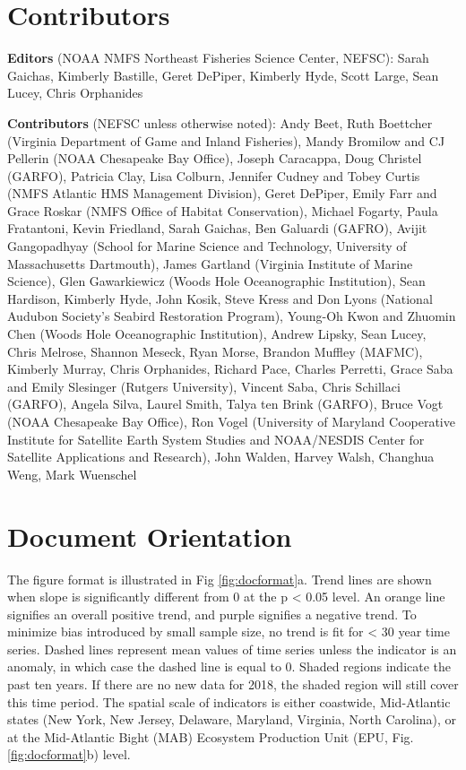 \documentclass[
  10pt,
]{article}
\begin{document}
\hypertarget{contributors}{%
\section{Contributors}\label{contributors}}

\textbf{Editors} (NOAA NMFS Northeast Fisheries Science Center, NEFSC):
Sarah Gaichas, Kimberly Bastille, Geret DePiper, Kimberly Hyde, Scott
Large, Sean Lucey, Chris Orphanides

\textbf{Contributors} (NEFSC unless otherwise noted): Andy Beet, Ruth
Boettcher (Virginia Department of Game and Inland Fisheries), Mandy
Bromilow and CJ Pellerin (NOAA Chesapeake Bay Office), Joseph Caracappa,
Doug Christel (GARFO), Patricia Clay, Lisa Colburn, Jennifer Cudney and
Tobey Curtis (NMFS Atlantic HMS Management Division), Geret DePiper,
Emily Farr and Grace Roskar (NMFS Office of Habitat Conservation),
Michael Fogarty, Paula Fratantoni, Kevin Friedland, Sarah Gaichas, Ben
Galuardi (GAFRO), Avijit Gangopadhyay (School for Marine Science and
Technology, University of Massachusetts Dartmouth), James Gartland
(Virginia Institute of Marine Science), Glen Gawarkiewicz (Woods Hole
Oceanographic Institution), Sean Hardison, Kimberly Hyde, John Kosik,
Steve Kress and Don Lyons (National Audubon Society's Seabird
Restoration Program), Young-Oh Kwon and Zhuomin Chen (Woods Hole
Oceanographic Institution), Andrew Lipsky, Sean Lucey, Chris Melrose,
Shannon Meseck, Ryan Morse, Brandon Muffley (MAFMC), Kimberly Murray,
Chris Orphanides, Richard Pace, Charles Perretti, Grace Saba and Emily
Slesinger (Rutgers University), Vincent Saba, Chris Schillaci (GARFO),
Angela Silva, Laurel Smith, Talya ten Brink (GARFO), Bruce Vogt (NOAA
Chesapeake Bay Office), Ron Vogel (University of Maryland Cooperative
Institute for Satellite Earth System Studies and NOAA/NESDIS Center for
Satellite Applications and Research), John Walden, Harvey Walsh,
Changhua Weng, Mark Wuenschel

\newpage

\hypertarget{document-orientation}{%
\section{Document Orientation}\label{document-orientation}}

The figure format is illustrated in Fig \ref{fig:docformat}a. Trend
lines are shown when slope is significantly different from 0 at the p
\textless{} 0.05 level. An orange line signifies an overall positive
trend, and purple signifies a negative trend. To minimize bias
introduced by small sample size, no trend is fit for \textless{} 30 year
time series. Dashed lines represent mean values of time series unless
the indicator is an anomaly, in which case the dashed line is equal to
0. Shaded regions indicate the past ten years. If there are no new data
for 2018, the shaded region will still cover this time period. The
spatial scale of indicators is either coastwide, Mid-Atlantic states
(New York, New Jersey, Delaware, Maryland, Virginia, North Carolina), or
at the Mid-Atlantic Bight (MAB) Ecosystem Production Unit (EPU, Fig.
\ref{fig:docformat}b) level.
\end{document}
